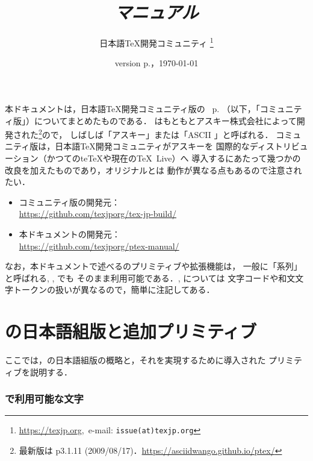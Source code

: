 \documentclass[a4paper,11pt,nomag,dvipdfmx]{jsarticle}
\begin{document}
\title{\emph{\pTeX マニュアル}}
\author{日本語\TeX 開発コミュニティ\null
\thanks{\url{https://texjp.org},\ e-mail: \texttt{issue(at)texjp.org}}}
\date{version p\the\ptexversion.\the\ptexminorversion\ptexrevision，\today}
\maketitle

本ドキュメントは，日本語\TeX 開発コミュニティ版の
\pTeX~p\the\ptexversion.\the\ptexminorversion\ptexrevision
（以下，「コミュニティ版\pTeX 」）についてまとめたものである．
\pTeX はもともとアスキー株式会社によって開発された\footnote{最新版は
p3.1.11 (2009/08/17)．\url{https://asciidwango.github.io/ptex/}}ので，
しばしば「アスキー\pTeX 」または「ASCII \pTeX 」と呼ばれる．
コミュニティ版\pTeX は，日本語\TeX 開発コミュニティがアスキー\pTeX を
国際的なディストリビューション（かつてのte\TeX や現在の\TeX~Live）へ
導入するにあたって幾つかの改良を加えたものであり，オリジナルとは
動作が異なる点もあるので注意されたい．
\begin{itemize}
  \item コミュニティ版\pTeX の開発元：\\
    \url{https://github.com/texjporg/tex-jp-build/}
  \item 本ドキュメントの開発元：\\
    \url{https://github.com/texjporg/ptex-manual/}
\end{itemize}

なお，本ドキュメントで述べる\pTeX のプリミティブや拡張機能は，
一般に「\pTeX 系列」と呼ばれる\epTeX, \upTeX, \eupTeX でも
そのまま利用可能である．\upTeX, \eupTeX については
文字コードや和文文字トークンの扱いが異なるので，簡単に注記してある．

\newpage
\tableofcontents

\newpage

\part{\pTeX の日本語組版と追加プリミティブ}

ここでは，\pTeX の日本語組版の概略と，それを実現するために導入された
プリミティブを説明する．

\section{\pTeX で利用可能な文字}
\label{sec:ptexchar}

\end{document}
